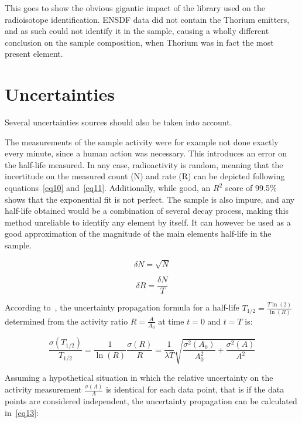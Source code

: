 This goes to show the obvious gigantic impact of the library used on the radioisotope identification. ENSDF data did not contain the Thorium emitters, and as such could not identify it in the sample, causing a wholly different conclusion on the sample composition, when Thorium was in fact the most present element.


\section{Uncertainties}

Several uncertainties sources should also be taken into account.

The measurements of the sample activity were for example not done exactly every minute, since a human action was necessary. This introduces an error on the half-life measured. In any case, radioactivity is random, meaning that the incertitude on the measured count (N) and rate (R) can be depicted following equations~\ref{eq10} and~\ref{eq11}. Additionally, while good, an $R^2$ score of 99.5\% shows that the exponential fit is not perfect. The sample is also impure, and any half-life obtained would be a combination of several decay process, making this method unreliable to identify any element by itself. It can however be used as a good approximation of the magnitude of the main elements half-life in the sample.

\begin{equation}\label{eq10}
\delta N = \sqrt{N}
\end{equation}

\begin{equation}\label{eq11}
\delta R = \frac{\delta N}{T}
\end{equation}


According to~\cite{pomme01}, the  uncertainty  propagation  formula  for  a  half-life $T_{1/2} = \frac{T\ln(2)}{\ln(R)}$ determined from the activity ratio $R = \frac{A}{A_0}$ at time $t = 0$ and $t = T$ is:

\begin{equation}\label{eq12}
\frac{\sigma(T_{1/2})}{T_{1/2}} = \frac{1}{\ln(R)} \frac{\sigma(R)}{R} = \frac{1}{\lambda T} \sqrt{\frac{\sigma^2(A_0)}{A_0^2} + \frac{\sigma^2(A)}{A^2}}
\end{equation}



Assuming a hypothetical situation in which the relative uncertainty on the activity measurement $\frac{\sigma(A)}{A}$ is identical for each data point, that is if the data points are considered independent, the uncertainty propagation can be calculated in~\ref{eq13}:

